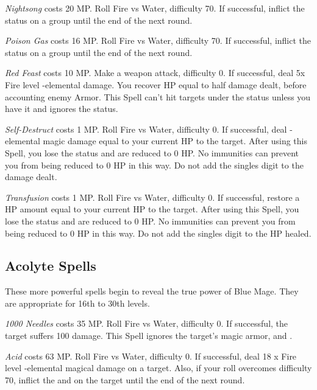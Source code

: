 \begin{multicols}{2}
    \textit{Nightsong} costs 20 MP\@. Roll Fire vs Water, difficulty 70. If successful, inflict the  status on a group until the end of the next round.
    
    \textit{Poison Gas} costs 16 MP\@. Roll Fire vs Water, difficulty 70. If successful, inflict the  status on a group until the end of the next round.
    
    \textit{Red Feast} costs 10 MP\@. Make a weapon attack, difficulty 0. If successful, deal 5x Fire level -elemental damage. You recover HP equal to half damage dealt, before accounting enemy Armor. This Spell can’t hit targets under the  status unless you have it and ignores the  status.
    
    \textit{Self-Destruct} costs 1 MP\@. Roll Fire vs Water, difficulty 0. If successful, deal -elemental magic damage equal to your current HP to the target. After using this Spell, you lose the  status and are reduced to 0 HP\@. No immunities can prevent you from being reduced to 0 HP in this way. Do not add the singles digit to the damage dealt.

    \textit{Transfusion} costs 1 MP\@. Roll Fire vs Water, difficulty 0. If successful, restore a HP amount equal to your current HP to the target. After using this Spell, you lose the  status and are reduced to 0 HP\@. No immunities can prevent you from being reduced to 0 HP in this way. Do not add the singles digit to the HP healed.
    
\subsection{Acolyte Spells}\label{subsec:blue-acolyte}

These more powerful spells begin to reveal the true power of Blue Mage. They are appropriate for 16th to 30th levels.

    \textit{1000 Needles} costs 35 MP\@. Roll Fire vs Water, difficulty 0. If successful, the target suffers 100 damage. This Spell ignores the target’s magic armor,  and .

    \textit{Acid} costs 63 MP\@. Roll Fire vs Water, difficulty 0. If successful, deal 18 x Fire level -elemental magical damage on a target. Also, if your roll overcomes difficulty 70, inflict the  and  on the target until the end of the next round.
    

\end{multicols}

